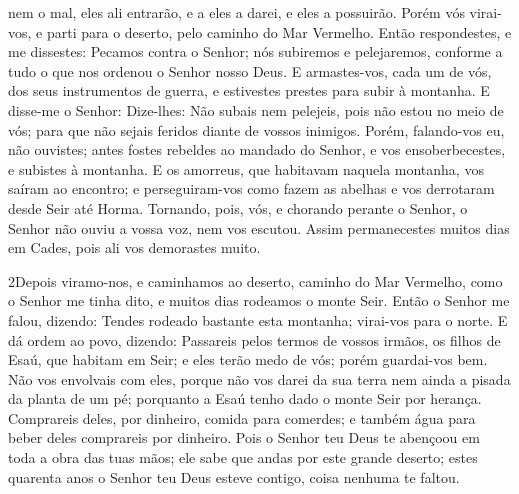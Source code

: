 nem o mal, eles ali entrarão, e a eles a darei, e eles a possuirão.
Porém vós virai-vos, e parti para o deserto, pelo caminho do
Mar Vermelho. Então respondestes, e me dissestes: Pecamos
contra o Senhor; nós subiremos e pelejaremos, conforme a tudo o que
nos ordenou o Senhor nosso Deus. E armastes-vos, cada um de vós, dos
seus instrumentos de guerra, e estivestes prestes para subir à
montanha. E disse-me o Senhor: Dize-lhes: Não subais nem
pelejeis, pois não estou no meio de vós; para que não sejais feridos
diante de vossos inimigos. Porém, falando-vos eu, não
ouvistes; antes fostes rebeldes ao mandado do Senhor, e vos
ensoberbecestes, e subistes à montanha. E os amorreus, que
habitavam naquela montanha, vos saíram ao encontro; e
perseguiram-vos como fazem as abelhas e vos derrotaram desde Seir
até Horma. Tornando, pois, vós, e chorando perante o Senhor,
o Senhor não ouviu a vossa voz, nem vos escutou. Assim
permanecestes muitos dias em Cades, pois ali vos demorastes muito.

\medskip

\lettrine{2} Depois viramo-nos, e caminhamos ao deserto,
caminho do Mar Vermelho, como o Senhor me tinha dito, e muitos dias
rodeamos o monte Seir. Então o Senhor me falou, dizendo:
Tendes rodeado bastante esta montanha; virai-vos para o norte.
E dá ordem ao povo, dizendo: Passareis pelos termos de vossos
irmãos, os filhos de Esaú, que habitam em Seir; e eles terão medo de
vós; porém guardai-vos bem. Não vos envolvais com eles, porque
não vos darei da sua terra nem ainda a pisada da planta de um pé;
porquanto a Esaú tenho dado o monte Seir por herança. Comprareis
deles, por dinheiro, comida para comerdes; e também água para beber
deles comprareis por dinheiro. Pois o Senhor teu Deus te
abençoou em toda a obra das tuas mãos; ele sabe que andas por este
grande deserto; estes quarenta anos o Senhor teu Deus esteve
contigo, coisa nenhuma te faltou.

